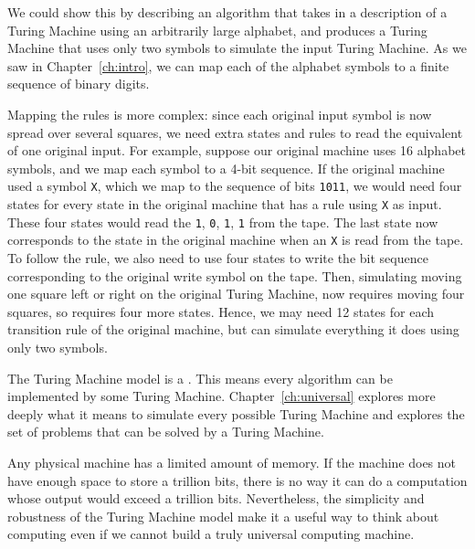 \begin{schemeregion}
We could show this by describing an algorithm that takes in a description of a Turing Machine using an arbitrarily large alphabet, and produces a Turing Machine that uses only two symbols to simulate the input Turing Machine.  As we saw in Chapter~\ref{ch:intro}, we can map each of the alphabet symbols to a finite sequence of binary digits.  

Mapping the rules is more complex: since each original input symbol is now spread over several squares, we need extra states and rules to read the equivalent of one original input.  For example, suppose our original machine uses 16 alphabet symbols, and we map each symbol to a 4-bit sequence.  If the original machine used a symbol \verb+X+, which we map to the sequence of bits \verb+1011+, we would need four states for every state in the original machine that has a rule using \verb+X+ as input.  These four states would read the \verb+1+, \verb+0+, \verb+1+, \verb+1+ from the tape.  The last state now corresponds to the state in the original machine when an \verb+X+ is read from the tape.  To follow the rule, we also need to use four states to write the bit sequence corresponding to the original write symbol on the tape.  Then, simulating moving one square left or right on the original Turing Machine, now requires moving four squares, so requires four more states.  Hence, we may need 12 states for each transition rule of the original machine, but can simulate everything it does using only two symbols.

The Turing Machine model is a .  This means every algorithm can be implemented by some Turing Machine.    Chapter~\ref{ch:universal} explores more deeply what it means to simulate every possible Turing Machine and explores the set of problems that can be solved by a Turing Machine.  

Any physical machine has a limited amount of memory.  If the machine does not have enough space to store a trillion bits, there is no way it can do a computation whose output would exceed a trillion bits.  Nevertheless, the simplicity and robustness of the Turing Machine model make it a useful way to think about computing even if we cannot build a truly universal computing machine.


\end{schemeregion}
